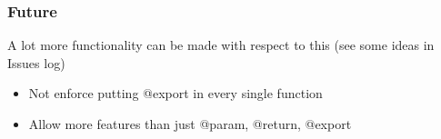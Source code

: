 \documentclass[11pt]{article}
\begin{document}
\subsubsection{Future}
A lot more functionality can be made with respect to this (see some ideas in Issues log)

\begin{itemize}
\item Not enforce putting @export in every single function
\item Allow more features than just @param, @return, @export
\end{itemize}
\end{document}
